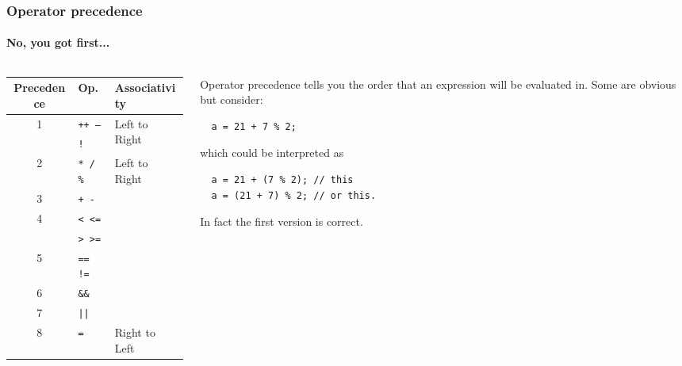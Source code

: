 \documentclass{beamer}
\begin{document}
\begin{frame}[fragile]
  \frametitle{Operator precedence}
  \framesubtitle{No, you got first...}
  \begin{columns}[t]
	  \begin{column}[T]{0.44\textwidth}
		  \begin{tabular}{c|l|m{2.1cm}}
			  Precedence & Op. & Associativity \\
			  \hline
			  \multirow{2}{*}{1} & \texttt{++ --} & \multirow{2}{*}{Left to Right}\\
			    & \texttt{!} \\
			  \hline
			  2 & \texttt{* / \%} & \multirow{6}{*}{Left to Right} \\
			  \cline{1-2}
			  3 & \texttt{+ -} & \\
			  \cline{1-2}
			  \multirow{2}{*}{4} & \texttt{< <=} \\
			    & \texttt{> >=} \\
			  \cline{1-2}
			  5 & \texttt{== !=} \\
			  \cline{1-2}
			  6 & \texttt{\&\&} \\
			  \cline{1-2}
			  7 & \texttt{||} \\
			  \hline
			  8 & \texttt{=} & Right to Left
		  \end{tabular}
	 	\end{column}
  	\begin{column}[T]{0.38\textwidth}
	  Operator precedence tells you the order that an expression will be evaluated in.  Some are obvious but consider:
	  \begin{lstlisting}
  a = 21 + 7 % 2;
	  \end{lstlisting}
    which could be interpreted as
	  \begin{lstlisting}
  a = 21 + (7 % 2); // this
  a = (21 + 7) % 2; // or this.
	  \end{lstlisting}
	  In fact the first version is correct.
	  \pause
	  
  	\end{column}
 	\end{columns}
\end{frame}
\begin{frame}
\end{frame}
\end{document}
